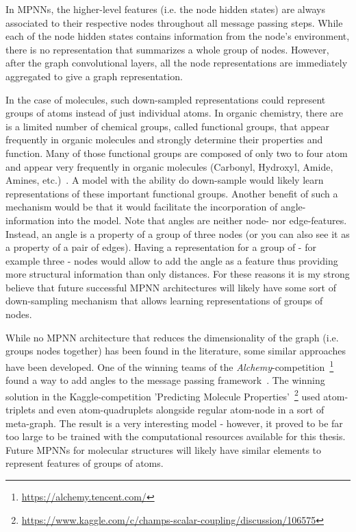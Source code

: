 In MPNNs, the higher-level features (i.e. the node hidden states) are always associated to their respective nodes throughout all message passing steps. While each of the node hidden states contains information from the node's environment, there is no representation that summarizes a whole group of nodes. However, after the graph convolutional layers, all the node representations are immediately aggregated to give a graph representation.

In the case of molecules, such down-sampled representations could represent groups of atoms instead of just individual atoms. In organic chemistry, there are is a limited number of chemical groups, called functional groups, that appear frequently in organic molecules and strongly determine their properties and function. Many of those functional groups are composed of only two to four atom and appear very frequently in organic molecules (Carbonyl, Hydroxyl, Amide, Amines, etc.)~\cite{Organic-chemistry}. A model with the ability do down-sample would likely learn representations of these important functional groups. Another benefit of such a mechanism would be that it would facilitate the incorporation of angle-information into the model. Note that angles are neither node- nor edge-features. Instead, an angle is a property of a group of three nodes (or you can also see it as a property of a pair of edges). Having a representation for a group of - for example three - nodes would allow to add the angle as a feature thus providing more structural information than only distances. For these reasons it is my strong believe that future successful MPNN architectures will likely have some sort of down-sampling mechanism that allows learning representations of groups of nodes.

While no MPNN architecture that reduces the dimensionality of the graph (i.e. groups nodes together) has been found in the literature, some similar approaches have been developed. One of the winning teams of the \textit{Alchemy}-competition~\footnote{\url{https://alchemy.tencent.com/}} found a way to add angles to the message passing framework~\cite{Klicpera2019}. The winning solution in the Kaggle-competition 'Predicting Molecule Properties'~\footnote{\url{https://www.kaggle.com/c/champs-scalar-coupling/discussion/106575}} used atom-triplets and even atom-quadruplets alongside regular atom-node in a sort of meta-graph. The result is a very interesting model - however, it proved to be far too large to be trained with the computational resources available for this thesis. Future MPNNs for molecular structures will likely have similar elements to represent features of groups of atoms.

